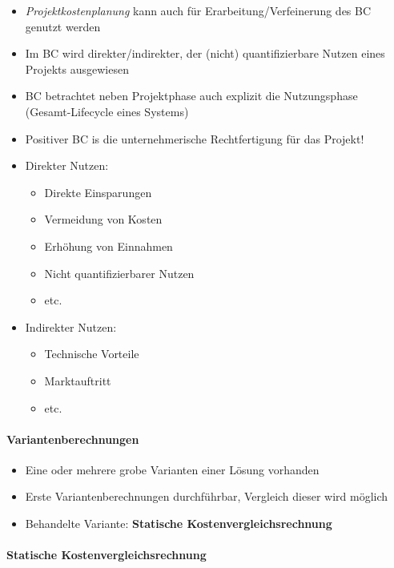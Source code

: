 \documentclass[a4paper]{article}
\begin{document}
			\begin{itemize}
				\item \textit{Projektkostenplanung} kann auch für Erarbeitung/Verfeinerung des BC genutzt werden
				\item Im BC wird direkter/indirekter, der (nicht) quantifizierbare Nutzen eines Projekts ausgewiesen
				\item BC betrachtet neben Projektphase auch explizit die Nutzungsphase\\
				(Gesamt-Lifecycle eines Systems)
				\item Positiver BC is die unternehmerische Rechtfertigung für das Projekt!
				\item Direkter Nutzen:
					\begin{itemize}
						\item Direkte Einsparungen
						\item Vermeidung von Kosten
						\item Erhöhung von Einnahmen
						\item Nicht quantifizierbarer Nutzen
						\item etc.
					\end{itemize}
				\item Indirekter Nutzen:
					\begin{itemize}
						\item Technische Vorteile
						\item Marktauftritt
						\item etc.
					\end{itemize}
			\end{itemize}
		
			\paragraph{Variantenberechnungen}
			
			\begin{itemize}
				\item Eine oder mehrere grobe Varianten einer Lösung vorhanden
				\item Erste Variantenberechnungen durchführbar, Vergleich dieser wird möglich
				\item Behandelte Variante: \textbf{Statische Kostenvergleichsrechnung}
			\end{itemize}
		
			\paragraph{Statische Kostenvergleichsrechnung}
			
\end{document}
